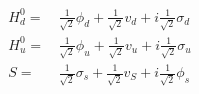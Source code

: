 \begin{align} 
H_d^0 = & \, \frac{1}{\sqrt{2}} \phi_{d}  + \frac{1}{\sqrt{2}} v_d  + i \frac{1}{\sqrt{2}} \sigma_{d} \\ 
H_u^0 = & \, \frac{1}{\sqrt{2}} \phi_{u}  + \frac{1}{\sqrt{2}} v_u  + i \frac{1}{\sqrt{2}} \sigma_{u} \\ 
S = & \, \frac{1}{\sqrt{2}} \sigma_s  + \frac{1}{\sqrt{2}} v_S  + i \frac{1}{\sqrt{2}} \phi_s 
\end{align} 
